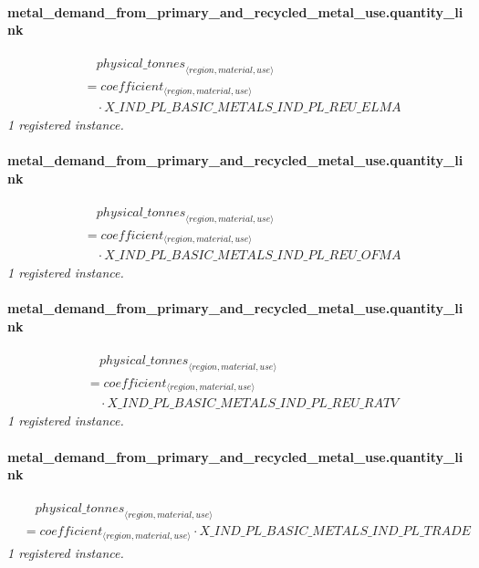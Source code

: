\documentclass[11pt]{article}
\begin{document}
\paragraph{metal\_demand\_from\_primary\_and\_recycled\_metal\_use.quantity\_link}
\begin{align*}
&\quad {physical\_tonnes}_{\langle region, material, use\rangle}\\
&= coefficient_{\langle region, material, use\rangle}\\
&\quad {}\cdot X\_IND\_PL\_BASIC\_METALS\_IND\_PL\_REU\_ELMA
\end{align*}
\noindent\emph{1 registered instance.}\par
\paragraph{metal\_demand\_from\_primary\_and\_recycled\_metal\_use.quantity\_link}
\begin{align*}
&\quad {physical\_tonnes}_{\langle region, material, use\rangle}\\
&= coefficient_{\langle region, material, use\rangle}\\
&\quad {}\cdot X\_IND\_PL\_BASIC\_METALS\_IND\_PL\_REU\_OFMA
\end{align*}
\noindent\emph{1 registered instance.}\par
\paragraph{metal\_demand\_from\_primary\_and\_recycled\_metal\_use.quantity\_link}
\begin{align*}
&\quad {physical\_tonnes}_{\langle region, material, use\rangle}\\
&= coefficient_{\langle region, material, use\rangle}\\
&\quad {}\cdot X\_IND\_PL\_BASIC\_METALS\_IND\_PL\_REU\_RATV
\end{align*}
\noindent\emph{1 registered instance.}\par
\paragraph{metal\_demand\_from\_primary\_and\_recycled\_metal\_use.quantity\_link}
\begin{align*}
&\quad {physical\_tonnes}_{\langle region, material, use\rangle}\\
&= coefficient_{\langle region, material, use\rangle} \cdot X\_IND\_PL\_BASIC\_METALS\_IND\_PL\_TRADE
\end{align*}
\noindent\emph{1 registered instance.}\par
\end{document}

